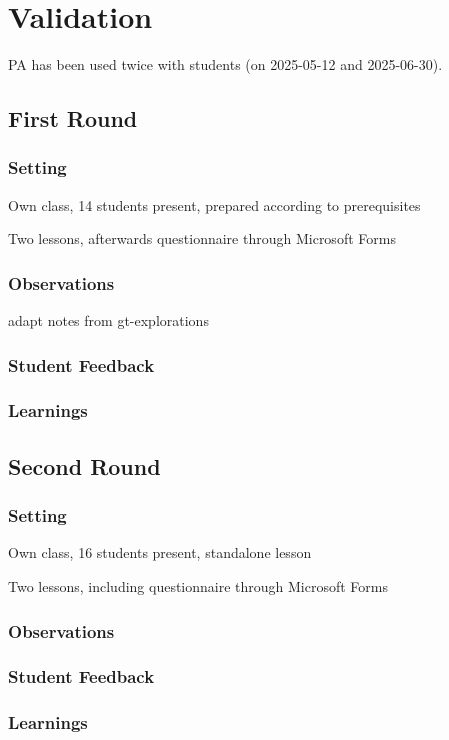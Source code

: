 \chapter{Validation} \label{ch_practice}

PA has been used twice with students (on 2025-05-12 and 2025-06-30).



\section{First Round} \label{sc_validation_ca}


\subsection{Setting}

\begin{todo}
\item Own class, 14 students present, prepared according to prerequisites
\item Two lessons, afterwards questionnaire through Microsoft Forms
\end{todo}


\subsection{Observations}

\begin{todo}
\item adapt notes from gt-explorations
\end{todo}


\subsection{Student Feedback}


\subsection{Learnings}



\section{Second Round} \label{sc_validation_compiler}


\subsection{Setting}

\begin{todo}
\item Own class, 16 students present, standalone lesson
\item Two lessons, including questionnaire through Microsoft Forms
\end{todo}


\subsection{Observations}


\subsection{Student Feedback}


\subsection{Learnings}

